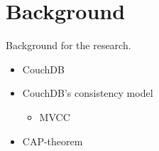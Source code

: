 \section{Background}

Background for the research.

\begin{itemize}
  \item CouchDB
  \item CouchDB's consistency model
  \begin{itemize}
    \item MVCC
  \end{itemize}
  \item CAP-theorem
\end{itemize}
